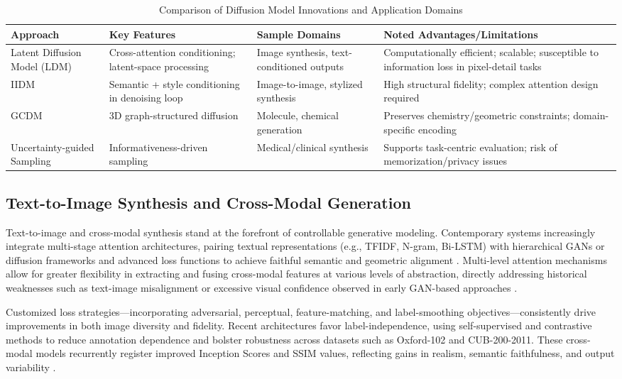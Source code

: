 \documentclass[sigconf]{acmart}
\begin{document}
\begin{table*}[htbp]
\centering
\caption{Comparison of Diffusion Model Innovations and Application Domains}
\label{tab:diffusion_summary}
\begin{adjustbox}{max width=\textwidth}
\begin{tabular}{llll}
\toprule
\textbf{Approach} & \textbf{Key Features} & \textbf{Sample Domains} & \textbf{Noted Advantages/Limitations} \\
\midrule
Latent Diffusion Model (LDM) & Cross-attention conditioning; latent-space processing & Image synthesis, text-conditioned outputs & Computationally efficient; scalable; susceptible to information loss in pixel-detail tasks \\
IIDM & Semantic + style conditioning in denoising loop & Image-to-image, stylized synthesis & High structural fidelity; complex attention design required \\
GCDM & 3D graph-structured diffusion & Molecule, chemical generation & Preserves chemistry/geometric constraints; domain-specific encoding \\
Uncertainty-guided Sampling & Informativeness-driven sampling & Medical/clinical synthesis & Supports task-centric evaluation; risk of memorization/privacy issues \\
\bottomrule
\end{tabular}
\end{adjustbox}
\end{table*}

\subsection{Text-to-Image Synthesis and Cross-Modal Generation}

Text-to-image and cross-modal synthesis stand at the forefront of controllable generative modeling. Contemporary systems increasingly integrate multi-stage attention architectures, pairing textual representations (e.g., TFIDF, N-gram, Bi-LSTM) with hierarchical GANs or diffusion frameworks and advanced loss functions to achieve faithful semantic and geometric alignment \cite{ref94,ref96}. Multi-level attention mechanisms allow for greater flexibility in extracting and fusing cross-modal features at various levels of abstraction, directly addressing historical weaknesses such as text-image misalignment or excessive visual confidence observed in early GAN-based approaches \cite{ref96}.

Customized loss strategies—incorporating adversarial, perceptual, feature-matching, and label-smoothing objectives—consistently drive improvements in both image diversity and fidelity. Recent architectures favor label-independence, using self-supervised and contrastive methods to reduce annotation dependence and bolster robustness across datasets such as Oxford-102 and CUB-200-2011. These cross-modal models recurrently register improved Inception Scores and SSIM values, reflecting gains in realism, semantic faithfulness, and output variability \cite{ref94,ref96,ref101}.
\end{document}
